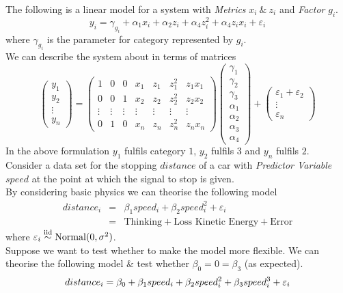 \documentclass[11pt,a4paper]{article}
\begin{document}
The following is a linear model for a system with \textit{Metrics} $x_i\ \&\ z_i$ and \textit{Factor} $g_i$.
$$y_i=\gamma_{g_i}+\alpha_1x_i+\alpha_2z_i+\alpha_4z_i^2+\alpha_4z_ix_i+\varepsilon_i$$
where $\gamma_{g_i}$ is the parameter for category represented by $g_i$.\\
We can describe the system about in terms of matrices
$$\begin{pmatrix}y_1\\y_2\\\vdots\\y_n\end{pmatrix}=\begin{pmatrix}1&0&0&x_1&z_1&z_1^2&z_1x_1\\0&0&1&x_2&z_2&z_2^2&z_2x_2\\\vdots&\vdots&\vdots&\vdots&\vdots&\vdots&\vdots\\0&1&0&x_n&z_n&z_n^2&z_nx_n\end{pmatrix}\begin{pmatrix}
\gamma_1\\\gamma_2\\\gamma_3\\\alpha_1\\\alpha_2\\\alpha_3\\\alpha_4\end{pmatrix}+\begin{pmatrix}\varepsilon_1+\varepsilon_2\\\vdots\\\varepsilon_n\end{pmatrix}$$
In the above formulation $y_1$ fulfils category $1$, $y_2$ fulfils $3$ and $y_n$ fulfils $2$.\\

Consider a data set for the stopping $distance$ of a car with \textit{Predictor Variable} $speed$ at the point at which the signal to stop is given.\\
By considering basic physics we can theorise the following model
\[\begin{array}{rcl}
distance_i&=&\beta_1 speed_i+\beta_2 speed_i^2+\varepsilon_i\\
&=&\text{Thinking}+\text{Loss Kinetic Energy}+\text{Error}
\end{array}\]
where $\varepsilon_i\overset{\text{iid}}{\sim}\text{Normal}(0,\sigma^2)$.\\
Suppose we want to test whether to make the model more flexible. We can theorise the following model \& test whether $\beta_0=0=\beta_3$ (as expected).
$$distance_i=\beta_0+\beta_1 speed_i+\beta_2 speed_i^2+\beta_3speed_i^3+\varepsilon_i\\$$
\end{document}
